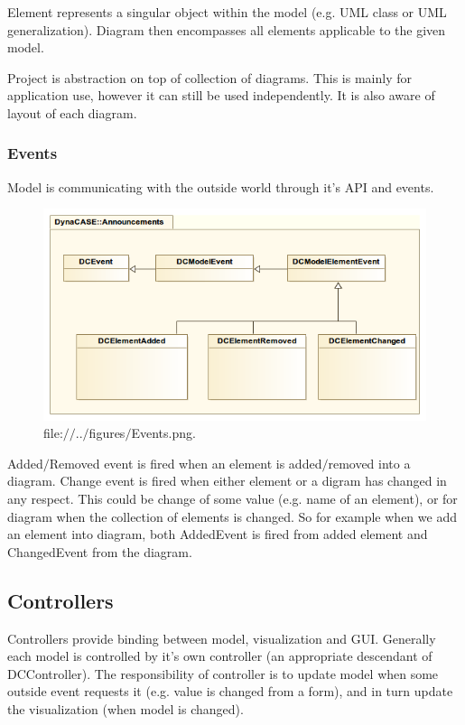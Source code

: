 \documentclass[a4paper,10pt,twoside]{book}
\begin{document}
Element represents a singular object within the model (e.g. UML class or UML generalization). Diagram then encompasses all elements applicable to the given model.

Project is abstraction on top of collection of diagrams. This is mainly for application use, however it can still be used independently. It is also aware of layout of each diagram.
\subsubsection{ Events}
Model is communicating with the outside world through it's API and events.

\begin{figure}

\begin{center}
\includegraphics[width=1.0\textwidth]{../figures/Events.png}\caption{file:$/$$/$..$/$figures$/$Events.png.\label{../figures/Events.png}}\end{center}
\end{figure}


Added$/$Removed event is fired when an element is added$/$removed into a diagram. Change event is fired when either element or a digram has changed in any respect. This could be change of some value (e.g. name of an element), or for diagram when the collection of elements is changed. So for example when we add an element into diagram, both AddedEvent is fired from added element and ChangedEvent from the diagram.
\subsection{ Controllers}
Controllers provide binding between model, visualization and GUI. Generally each model is controlled by it's own controller (an appropriate descendant of DCController). The responsibility of controller is to update model when some outside event requests it (e.g. value is changed from a form), and in turn update the visualization (when model is changed).
\end{document}
